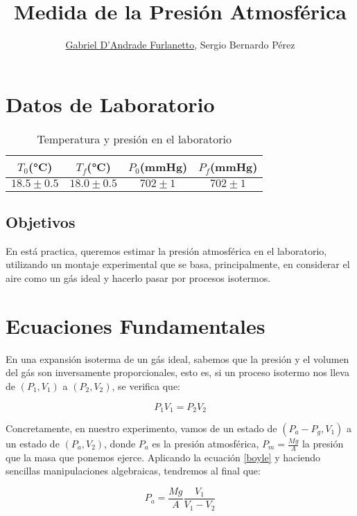 \documentclass[a4paper,12pt]{article}
\begin{document}
\title{Medida de la Presión Atmosférica}
\author{\underline{Gabriel D'Andrade Furlanetto}, Sergio Bernardo Pérez}
\maketitle
\pagebreak

\section{Datos de Laboratorio}
\begin{table}[h!]
  \centering
  \caption{Temperatura y presión en el laboratorio}
  \label{bar}
  \begin{tabular}{|c|c|c|c|}
  \hline
    $T_0$(°C) & $T_f$(°C) & $P_0$(mmHg) & $P_f$(mmHg) \\ 
    \hline
    $18.5 \pm 0.5$&$18.0\pm 0.5$ & $702 \pm 1$&$ 702 \pm 1$ \\ 
    \hline 
  \end{tabular}
\end{table}
\subsection{Objetivos}
En está practica, queremos estimar la presión atmosférica en el laboratorio, utilizando un montaje experimental que se basa, principalmente, en considerar el aire como un gás ideal y hacerlo pasar por procesos isotermos.

\section{Ecuaciones Fundamentales}
En una expansión isoterma de un gás ideal, sabemos que la presión y el volumen del gás son inversamente proporcionales, esto es, si un proceso isotermo nos lleva de $(P_1,V_1)$ a $(P_2,V_2)$, se verifica que:

\begin{equation}
  \label{boyle}
  P_1V_1 = P_2 V_2
\end{equation}

Concretamente, en nuestro experimento, vamos de un estado de $(P_a - P_g, V_1)$ a un estado de $(P_a,V_2)$, donde $P_a$ es la presión atmosférica, $P_m = \frac{Mg}{A}$ la presión que la masa que ponemos ejerce. Aplicando la ecuación \eqref{boyle} y haciendo sencillas manipulaciones algebraicas, tendremos al final que:

\begin{equation}
  \label{press}
  P_a = \frac{Mg}{A} \frac{V_1}{V_1-V_2}
\end{equation}
\end{document}
